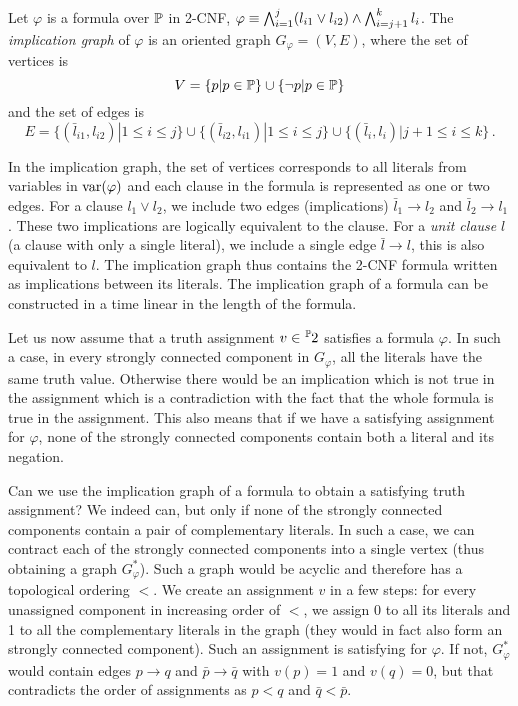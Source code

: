 \begin{definition}
Let $\varphi$ is a formula over $\mathbb{P}$ in 2-CNF, $\varphi \equiv \bigwedge_{i=1}^j (l_{i1} \lor l_{i2}) \land \bigwedge_{i=j+1}^k l_{i}$. The \emph{implication graph} of $\varphi$ is an oriented graph $G_\varphi = (V, E)$, where the set of vertices is $$V = \{p | p \in \mathbb{P}\} \cup \{\neg p | p \in \mathbb{P}\}$$ and the set of edges is $$E = \{(\bar{l}_{i1}, l_{i2}) | 1 \leq i \leq j\} \cup \{(\bar{l}_{i2}, l_{i1}) | 1 \leq i \leq j \} \cup \{(\bar{l}_i, l_i) | j + 1 \leq i \leq k\}\,.$$
\end{definition}

In the implication graph, the set of vertices corresponds to all literals from variables in $\operatorname{var}(\varphi)$ and each clause in the formula is represented as one or two edges. For a clause $l_1 \lor l_2$, we include two edges (implications) $\bar{l}_1 \to l_2$ and $\bar{l}_2 \to l_1$. These two implications are logically equivalent to the clause. For a \emph{unit clause} $l$ (a clause with only a single literal), we include a single edge $\bar{l} \to l$, this is also equivalent to $l$. The implication graph thus contains the 2-CNF formula written as implications between its literals. The implication graph of a formula can be constructed in a time linear in the length of the formula.

Let us now assume that a truth assignment $v \in \fset{\Prop}{2}$ satisfies a formula $\varphi$. In such a case, in every strongly connected component in $G_\varphi$, all the literals have the same truth value. Otherwise there would be an implication which is not true in the assignment which is a contradiction with the fact that the whole formula is true in the assignment. This also means that if we have a satisfying assignment for $\varphi$, none of the strongly connected components contain both a literal and its negation. 

Can we use the implication graph of a formula to obtain a satisfying truth assignment? We indeed can, but only if none of the strongly connected components contain a pair of complementary literals. In such a case, we can contract each of the strongly connected components into a single vertex (thus obtaining a graph $G_\varphi^*$). Such a graph would be acyclic and therefore has a topological ordering $<$. We create an assignment $v$ in a few steps: for every unassigned component in increasing order of $<$, we assign 0 to all its literals and 1 to all the complementary literals in the graph (they would in fact also form an strongly connected component). Such an assignment is satisfying for $\varphi$. If not, $G_\varphi^*$ would contain edges $p \to q$ and $\bar{p}\to\bar{q}$ with $v(p) = 1$ and $v(q) = 0$, but that contradicts the order of assignments as $p < q$ and $\bar{q} < \bar{p}$.

